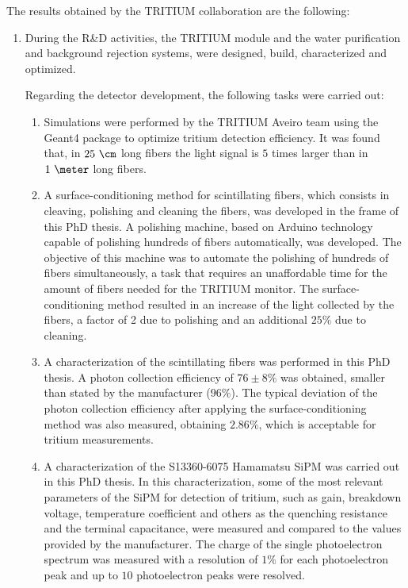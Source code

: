 The results obtained by the TRITIUM collaboration are the following:

\begin{enumerate}
\item{} During the R\&D activities, the TRITIUM module and the water purification and background rejection systems, were designed, build, characterized and optimized. 

Regarding the detector development, the following tasks were carried out:

\begin{enumerate}
\item{} Simulations were performed by the TRITIUM Aveiro team using the Geant4 package to optimize tritium detection efficiency. It was found that, in $25~\cm$ long fibers the light signal is $5$ times larger than in $1~\meter$ long fibers. %

\item{} A surface-conditioning method for scintillating fibers, which consists in cleaving, polishing and cleaning the fibers, was developed in the frame of this PhD thesis. A polishing machine, based on Arduino technology capable of polishing hundreds of fibers automatically, was developed. The objective of this machine was to automate the polishing of hundreds of fibers simultaneously, a task that requires an unaffordable time for the amount of fibers needed for the TRITIUM monitor. The surface-conditioning method resulted in an increase of the light collected by the fibers, a factor of 2 due to polishing and an additional $25\%$ due to cleaning. 

\item{} A characterization of the scintillating fibers was performed in this PhD thesis. A photon collection efficiency of $76\pm 8\%$ was obtained, smaller than stated by the manufacturer ($96\%$). The typical deviation of the photon collection efficiency after applying the surface-conditioning method was also measured, obtaining $2.86\%$, which is acceptable for tritium measurements.

\item{} A characterization of the S13360-6075 Hamamatsu SiPM was carried out in this PhD thesis. In this characterization, some of the most relevant parameters of the SiPM for detection of tritium, such as gain, breakdown voltage, temperature coefficient and others as the quenching resistance and the terminal capacitance, were measured and compared to the values provided by the manufacturer. The charge of the single photoelectron spectrum was measured with a resolution of $1\%$ for each photoelectron peak and up to $10$ photoelectron peaks were resolved. %


\end{enumerate}
\end{enumerate}

